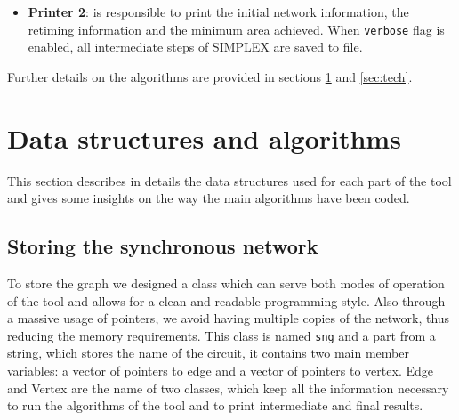 \documentclass{acm_proc_article-sp}
\begin{document}
\begin{itemize}
\begin{enumerate}
      \item {\bf SIMPLEX}: given the information found in the previous step, the
        retiming problem is expressed as a set of linear disequations and a
        function to minimize, which is the total number of registers after
        retiming. The disequations are the constraints to which the network is
        subject to: there must be no edge with negative weight and the final circuit
        has to meet the target clock cycle.
        SIMPLEX class includes, among the others, the following important methods
        \cite{simplex}:
        \begin {itemize}
          \item {\bf Make Tableau}: transforms the constraints and the objective
            function into a matrix.
          \item {\bf Phase 1}: performs rows operations to get a feasible solution
            to the linear system.
          \item {\bf Phase 2}: searches for the legal and feasible retiming vector
            that minimizes the registers count. This is done again by performing
            row operations on the matrix or \texttt{tableau}.
        \end{itemize}
    \end{enumerate}
  \item {\bf Printer 2}: is responsible to print the initial network information,
    the retiming information and the minimum area achieved. When \texttt{verbose}
    flag is enabled, all intermediate steps of SIMPLEX are saved to file.
\end{itemize}

Further details on the algorithms are provided in sections \ref{sec:struct} and
\ref{sec:tech}.


\section{Data structures and algorithms}
\label{sec:struct}

This section describes in details the data structures used for each part of the
tool and gives some insights on the way the main algorithms have been coded.

\subsection{Storing the synchronous network}

To store the graph we designed a class which can serve both modes of operation
of the tool and allows for a clean and readable programming style. Also through
a massive usage of pointers, we avoid having multiple copies of the network,
thus reducing the memory requirements.
This class is named \texttt{sng} and a part from a string, which stores the name
of the circuit, it contains two main member variables: a vector of pointers to
edge and a vector of pointers to vertex. Edge and Vertex are the name of two
classes, which keep all the information necessary to run the algorithms of the
tool and to print intermediate and final results.
\end{document}
